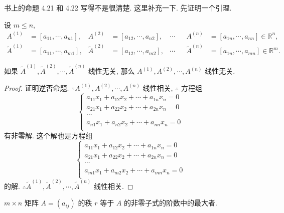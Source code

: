 \documentclass[color=black,device=normal,lang=cn,mode=geye]{elegantnote}
\begin{document}
书上的命题 4.21 和 4.22 写得不是很清楚. 这里补充一下. 先证明一个引理.
\begin{lemma}\label{l3.1}
    设 $m\leq n$,
    \begin{align*}
        A^{(1)} & =[a_{11},\cdots,a_{n1}], & A^{(2)} & =[a_{12},\cdots,a_{n2}], & \cdots && A^{(n)} & =[a_{1n},\cdots,a_{nn}]\in\mathbb{R}^n, \\
        \widetilde{A}^{(1)} & =[a_{11},\cdots,a_{m1}], & \widetilde{A}^{(2)} & =[a_{12},\cdots,a_{m2}], & \cdots && \widetilde{A}^{(n)} & =[a_{1n},\cdots,a_{mn}]\in\mathbb{R}^m.
    \end{align*}
    
    如果 $\widetilde{A}^{(1)},\widetilde{A}^{(2)},\cdots,\widetilde{A}^{(n)}$ 线性无关, 那么 $A^{(1)},A^{(2)},\cdots,A^{(n)}$ 线性无关.
\end{lemma}
\begin{proof}
    证明逆否命题. $\because A^{(1)},A^{(2)},\cdots,A^{(n)}$ 线性相关, $\therefore$ 方程组
    \[\begin{cases}
        a_{11}x_1+a_{12}x_2+\cdots+a_{1n}x_n=0 \\
        a_{21}x_1+a_{22}x_2+\cdots+a_{2n}x_n=0 \\
        \cdots \\
        a_{n1}x_1+a_{n2}x_2+\cdots+a_{nn}x_n=0 \\
    \end{cases}\]
    有非零解. 这个解也是方程组
    \[\begin{cases}
        a_{11}x_1+a_{12}x_2+\cdots+a_{1n}x_n=0 \\
        a_{21}x_1+a_{22}x_2+\cdots+a_{2n}x_n=0 \\
        \cdots \\
        a_{m1}x_1+a_{m2}x_2+\cdots+a_{mn}x_n=0 \\
    \end{cases}\]
    的解. $\therefore\widetilde{A}^{(1)},\widetilde{A}^{(2)},\cdots,\widetilde{A}^{(n)}$ 线性相关.
\end{proof}
\begin{theorem}[书上的命题 4.21]\label{t3.2}
    $m\times n$ 矩阵 $A=(a_{ij})$ 的秩 $r$ 等于 $A$ 的非零子式的阶数中的最大者.
\end{theorem}
\end{document}
